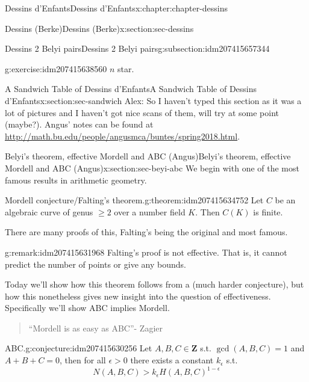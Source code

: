 \documentclass[oneside,10pt,]{book}
\numberwithin{equation}{section}
\newcommand{\ZZ}{\mathbf{Z}}
\newcommand{\gt}{>}
\begin{document}
\begin{chapterptx}{Dessins d'Enfants}{}{Dessins d'Enfants}{}{}{x:chapter:chapter-dessins}
\begin{sectionptx}{Dessins (Berke)}{}{Dessins (Berke)}{}{}{x:section:sec-dessins}
\begin{subsectionptx}{Dessins 2 Belyi pairs}{}{Dessins 2 Belyi pairs}{}{}{g:subsection:idm207415657344}
\begin{inlineexercise}{}{g:exercise:idm207415638560}
\(n\) star.%
\end{inlineexercise}
\end{subsectionptx}
\end{sectionptx}
%
%
\typeout{************************************************}
\typeout{************************************************}
%
\begin{sectionptx}{A Sandwich Table of Dessins d'Enfants}{}{A Sandwich Table of Dessins d'Enfants}{}{}{x:section:sec-sandwich}
Alex: So I haven't typed this section as it was a lot of pictures and I haven't got nice scans of them, will try at some point (maybe?). Angus' notes can be found at \url{http://math.bu.edu/people/angusmca/buntes/spring2018.html}.%
\end{sectionptx}
%
%
\typeout{************************************************}
\typeout{************************************************}
%
\begin{sectionptx}{Belyi's theorem, effective Mordell and ABC (Angus)}{}{Belyi's theorem, effective Mordell and ABC (Angus)}{}{}{x:section:sec-beyi-abc}
We begin with one of the most famous results in arithmetic geometry.%
\begin{theorem}{Mordell conjecture\slash{}Falting's theorem.}{}{g:theorem:idm207415634752}%
Let \(C\) be an algebraic curve of genus \(\ge 2\) over a number field \(K\). Then \(C(K)\) is finite.%
\end{theorem}
There are many proofs of this, Falting's being the original and most famous.%
\begin{remark}{}{g:remark:idm207415631968}%
Falting's proof is not effective. That is, it cannot predict the number of points or give any bounds.%
\end{remark}
Today we'll show how this theorem follows from a (much harder conjecture), but how this nonetheless gives new insight into the question of effectiveness. Specifically we'll show ABC implies Mordell.%
\begin{quote}%
``Mordell is as easy as ABC''- Zagier%
\end{quote}
\begin{conjecture}{ABC.}{}{g:conjecture:idm207415630256}%
Let \(A,B,C\in \ZZ\) s.t. \(\gcd(A,B,C)  =1 \) and \(A+B+C=0\), then for all \(\epsilon \gt 0\) there exists a constant \(k_\epsilon\) s.t.%
\begin{equation*}
N(A,B,C) \gt k_\epsilon H(A,B,C)^{1-\epsilon}
\end{equation*}

\end{conjecture}
\end{sectionptx}
\end{chapterptx}
\end{document}
